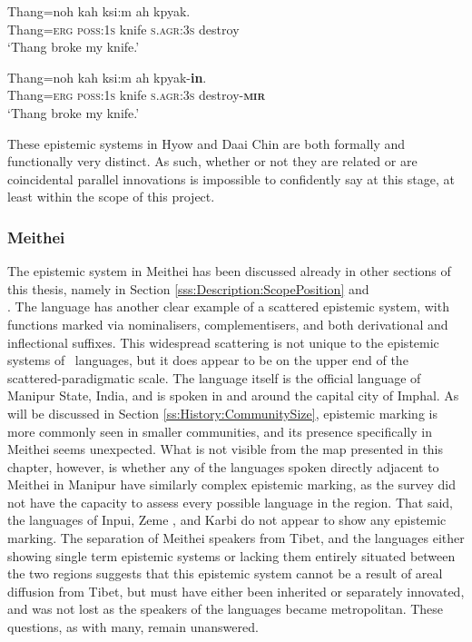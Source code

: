 \begin{exe}\label{e:History:DaaiChin}
\ex
\begin{xlist}
    \ex
\gll Thang=noh kah ksi:m ah kpyak. \\
Thang=\textsc{erg} \textsc{poss:1s} knife \textsc{s.agr:3s} destroy \\
\glt `Thang broke my knife.'

\ex
\gll Thang=noh kah ksi:m ah kpyak-\textbf{in}. \\
Thang=\textsc{erg} \textsc{poss:1s} knife \textsc{s.agr:3s} destroy-\textsc{\textbf{mir}} \\
\glt `Thang broke my knife.'
\end{xlist}
\cite[294]{SoHartmann2009}
\end{exe}

These epistemic systems in Hyow and Daai Chin are both formally and functionally very distinct. As such, whether or not they are related or are coincidental parallel innovations is impossible to confidently say at this stage, at least within the scope of this project.

\subsubsection{Meithei}
The epistemic system in Meithei \cite[Internal isolate: India,][]{Chelliah1997} has been discussed already in other sections of this thesis, namely in Section \ref{sss:Description:ScopePosition} and \[\]. The language has another clear example of a scattered epistemic system, with functions marked via nominalisers, complementisers, and both derivational and inflectional suffixes. This widespread scattering is not unique to the epistemic systems of \lfam\ languages, but it does appear to be on the upper end of the scattered-paradigmatic scale. The language itself is the official language of Manipur State, India, and is spoken in and around the capital city of Imphal. As will be discussed in Section \ref{ss:History:CommunitySize}, epistemic marking is more commonly seen in smaller communities, and its presence specifically in Meithei seems unexpected. What is not visible from the map presented in this chapter, however, is whether any of the languages spoken directly adjacent to Meithei in Manipur have similarly complex epistemic marking, as the survey did not have the capacity to assess every possible language in the region. That said, the languages of Inpui, Zeme \cites[both Zeme subfamily][]{Devi2014}{Chanu2017}, and Karbi \cite[Karbic][]{Konnerth2020} do not appear to show any epistemic marking. The separation of Meithei speakers from Tibet, and the languages either showing single term epistemic systems or lacking them entirely situated between the two regions suggests that this epistemic system cannot be a result of areal diffusion from Tibet, but must have either been inherited or separately innovated, and was not lost as the speakers of the languages became metropolitan. These questions, as with many, remain unanswered.

